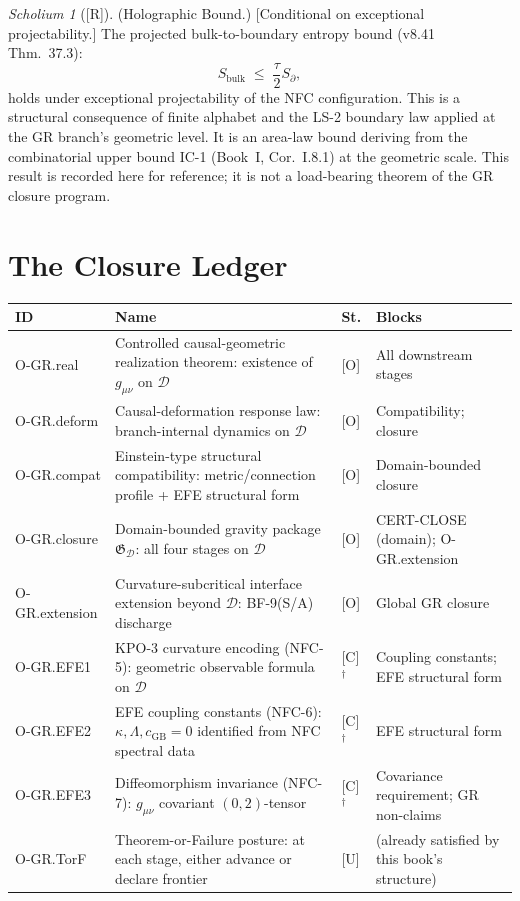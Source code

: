 \documentclass[12pt,oneside]{amsbook}
\theoremstyle{plain}
\theoremstyle{definition}
\theoremstyle{remark}
\newtheorem{scholium}[theorem]{Scholium}
\newcommand{\status}[1]{\textup{[#1]}}
\begin{document}
\begin{scholium}[\status{R}]\label{sch:holographic}
\textup{(Holographic Bound.)}
\textup{[Conditional on exceptional projectability.]}
The projected bulk-to-boundary entropy bound (v8.41 Thm.~37.3):
\[
 S_{\mathrm{bulk}} \;\leq\; \frac{\tau}{2} S_\partial,
\]
holds under exceptional projectability of the NFC configuration.
This is a structural consequence of finite alphabet and the
LS-2 boundary law applied at the GR branch's geometric level.
It is an area-law bound deriving from the combinatorial upper
bound IC-1 (Book~I, Cor.~I.8.1) at the geometric scale.
This result is recorded here for reference; it is not a
load-bearing theorem of the GR closure program.
\end{scholium}

\section{The Closure Ledger}
\label{sec:ledger}

\medskip
\renewcommand{\arraystretch}{1.4}
\noindent
\begin{tabular}{@{}p{2.0cm}p{4.5cm}p{1.2cm}p{4.0cm}@{}}
\hline
\textbf{ID} & \textbf{Name} & \textbf{St.} & \textbf{Blocks} \\
\hline
O-GR.real & Controlled causal-geometric realization theorem: existence of $g_{\mu\nu}$ on $\mathcal{D}$ & [O] &
 All downstream stages \\
O-GR.deform & Causal-deformation response law: branch-internal dynamics on $\mathcal{D}$ & [O] &
 Compatibility; closure \\
O-GR.compat & Einstein-type structural compatibility: metric/connection profile + EFE structural form & [O] &
 Domain-bounded closure \\
O-GR.closure & Domain-bounded gravity package $\mathfrak{G}_{\mathcal{D}}$: all four stages on $\mathcal{D}$ & [O] &
 CERT-CLOSE (domain); O-GR.extension \\
O-GR.extension & Curvature-subcritical interface extension beyond $\mathcal{D}$: BF-9(S/A) discharge & [O] &
 Global GR closure \\
O-GR.EFE1 & KPO-3 curvature encoding (NFC-5): geometric observable formula on $\mathcal{D}$ & [C]$^\dagger$ &
 Coupling constants; EFE structural form \\
O-GR.EFE2 & EFE coupling constants (NFC-6): $\kappa, \Lambda, c_{\mathrm{GB}}=0$ identified from NFC spectral data & [C]$^\dagger$ &
 EFE structural form \\
O-GR.EFE3 & Diffeomorphism invariance (NFC-7): $g_{\mu\nu}$ covariant $(0,2)$-tensor & [C]$^\dagger$ &
 Covariance requirement; GR non-claims \\
O-GR.TorF & Theorem-or-Failure posture: at each stage, either advance or declare frontier & [U] &
 (already satisfied by this book's structure) \\
\hline
\end{tabular}
\renewcommand{\arraystretch}{1}
\end{document}

